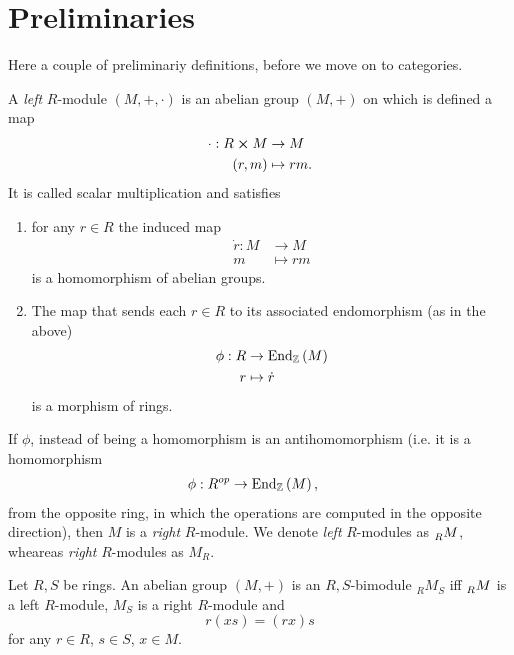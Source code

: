 \section{Preliminaries}
Here a couple of preliminariy definitions, before we move on to categories.

\begin{defn}[$R$-module]
	A {\em left} $R$-module $\left(M, +, \cdot\right)$ is an abelian group $\left(M, +\right)$ on which is defined a map
	\begin{align}
		\cdot: R \cross M &\to M \\
		\left(r, m\right) &\mapsto rm
	.\end{align} 
	It is called scalar multiplication and satisfies
	\begin{enumerate}
		\item for any $r \in R$ the induced map
			 \begin{align}
				\dot{r}: M &\to M \\
				m &\mapsto rm
			\end{align} 
			is a homomorphism of abelian groups.
		\item The map that sends each $r \in R$ to its associated endomorphism (as in the above)
			\begin{align}
				\phi: R &\to \mathrm{End}_{\mathbb{Z}}\left( M \right) \\
				r &\mapsto \dot{r}
			\end{align} 
			is a morphism of rings.
	\end{enumerate}
	If $\phi$, instead of being a homomorphism is an antihomomorphism (i.e. it is a homomorphism
	\begin{align}
		\phi: R^{op} &\to \mathrm{End}_{ \mathbb{Z}}\left( M \right)
	,\end{align} 
	from the opposite ring, in which the operations are computed in the opposite direction), then $M$ is a {\em right} $R$-module.
	We denote {\em left} $R$-modules as $\prescript{}{R}{M}$, wheareas {\em right} $R$-modules as $M_R$.
\end{defn}

\begin{defn}[Bimodule]
	Let $R,S$ be rings.
	An abelian group $\left(M, +\right)$ is an $R,S$-bimodule ${}_{R}{M}_{S}$ iff 
	$\prescript{}{R}{M}$ is a left $R$-module, $M_S$ is a right $R$-module and
	\begin{equation}
		r(xs) = (rx)s
	\end{equation} 
	for any $r \in R$, $s \in S$, $x \in M$.
\end{defn}

